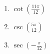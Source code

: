 \begin{multicols}{3}

\begin{enumerate}

\setcounter{enumi}{\value{HW}}

\item $\cot \left( \frac{11\pi}{12} \right)$
\item $\csc \left( \frac{5\pi}{12} \right)$
\item $\sec \left( -\frac{\pi}{12} \right)$  \label{sumdifflast}

\setcounter{HW}{\value{enumi}}

\end{enumerate}

\end{multicols}

